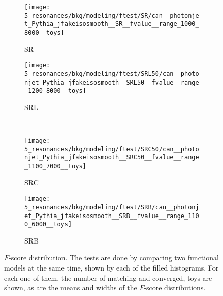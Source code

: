 \begin{figure}[ht!]
    \centering
    \begin{subfigure}[h]{0.49\linewidth}
        \centering
        \texttt{[image: 5\_resonances/bkg/modeling/ftest/SR/can\_\_photonjet\_Pythia\_jfakeisosmooth\_\_SR\_\_fvalue\_\_range\_1000\_8000\_\_toys]}
        \caption{SR}
    \end{subfigure}
    \begin{subfigure}[h]{0.49\linewidth}
        \centering
        \texttt{[image: 5\_resonances/bkg/modeling/ftest/SRL50/can\_\_photonjet\_Pythia\_jfakeisosmooth\_\_SRL50\_\_fvalue\_\_range\_1200\_8000\_\_toys]}
        \caption{SRL}
    \end{subfigure}
    \\
    \begin{subfigure}[h]{0.49\linewidth}
        \centering
        \texttt{[image: 5\_resonances/bkg/modeling/ftest/SRC50/can\_\_photonjet\_Pythia\_jfakeisosmooth\_\_SRC50\_\_fvalue\_\_range\_1100\_7000\_\_toys]}
        \caption{SRC}
    \end{subfigure}
    \begin{subfigure}[h]{0.49\linewidth}
        \centering
        \texttt{[image: 5\_resonances/bkg/modeling/ftest/SRB/can\_\_photonjet\_Pythia\_jfakeisosmooth\_\_SRB\_\_fvalue\_\_range\_1100\_6000\_\_toys]}
        \caption{SRB}
    \end{subfigure}
    \caption{\(F\)-score distribution. The tests are done by comparing two functional models at the same time, shown by each of the filled histograms. For each one of them, the number of matching and converged, toys are shown, as are the means and widths of the \(F\)-score distributions.}
    \label{fig:bkg:modeling:preparation:ftest:ftest}
\end{figure}

